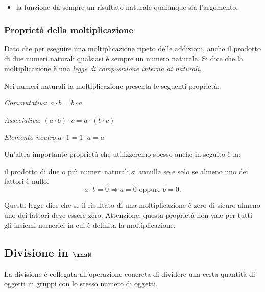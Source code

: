 \vspace{-1em}
\begin{osservazione}
\begin{itemize} [nosep]
\item la funzione dà sempre un risultato naturale qualunque sia l'argomento.
\end{itemize}

\end{osservazione}

\subsubsection{Proprietà della moltiplicazione}

Dato che per eseguire una moltiplicazione ripeto delle addizioni, 
anche il prodotto di due numeri  naturali qualsiasi è sempre un numero 
naturale. 
Si dice che la moltiplicazione è una \emph{legge di composizione interna ai
naturali}. 

Nei numeri naturali la moltiplicazione presenta le seguenti proprietà:

\begin{itemize*}
 \item \emph{Commutativa}: \(a \cdot b = b \cdot a\)
 \item \emph{Associativa}: \((a \cdot b) \cdot c = a \cdot (b \cdot c)\)
 \item \emph{Elemento neutro} \(a \cdot 1 = 1 \cdot a = a\)
\end{itemize*}

Un'altra importante proprietà che utilizzeremo spesso anche in seguito è la:

\begin{legge}
il prodotto di due o più numeri naturali si annulla se e solo se almeno uno 
dei fattori è nullo.
\[ a\cdot b=0\Leftrightarrow a=0\text{ oppure }b=0. \]
\end{legge}

Questa legge dice che se il risultato di una moltiplicazione è zero di 
sicuro almeno uno dei fattori deve essere zero. Attenzione: questa proprietà 
non vale per tutti gli insiemi numerici in cui è definita la 
moltiplicazione.

\subsection{Divisione in \(\insN\)}

La divisione è collegata all'operazione concreta di dividere una certa
quantità di oggetti in gruppi con lo stesso numero di oggetti.

